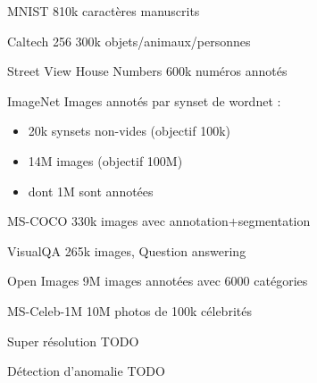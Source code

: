 \begin{frame}{MNIST}
  810k caractères manuscrits
\end{frame}

\begin{frame}{Caltech 256}
  300k objets/animaux/personnes
\end{frame}

\begin{frame}{Street View House Numbers}
  600k numéros annotés
\end{frame}

\begin{frame}{ImageNet}
  Images annotés par synset de wordnet :
  \begin{itemize}
    \item 20k synsets non-vides (objectif 100k)
    \item 14M images (objectif 100M)
    \item dont 1M sont annotées
  \end{itemize}
\end{frame}

\begin{frame}{MS-COCO}
   330k images avec annotation+segmentation
\end{frame}

\begin{frame}{VisualQA}
  265k images, Question answering
\end{frame}

\begin{frame}{Open Images}
  9M images annotées avec 6000 catégories
\end{frame}

\begin{frame}{MS-Celeb-1M}
  10M photos de 100k célebrités
\end{frame}

\begin{frame}{Super résolution}
  \alert{TODO}
\end{frame}

\begin{frame}{Détection d'anomalie}
  \alert{TODO}
\end{frame}
